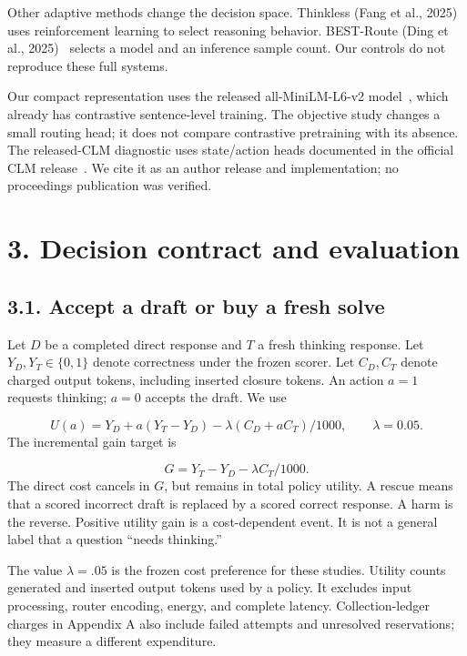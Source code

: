 \documentclass[11pt,a4paper]{article}
\begin{document}
Other adaptive methods change the decision space. Thinkless (Fang et al., 2025)~\citep{fang2025thinkless} uses reinforcement learning to select reasoning behavior. BEST-Route (Ding et al., 2025)~\citep{ding2025bestroute} selects a model and an inference sample count. Our controls do not reproduce these full systems.

Our compact representation uses the released all-MiniLM-L6-v2 model~\citep{sentencetransformersAllMiniLML6v2}, which already has contrastive sentence-level training. The objective study changes a small routing head; it does not compare contrastive pretraining with its absence. The released-CLM diagnostic uses state/action heads documented in the official CLM release~\citep{kwok2026clm}. We cite it as an author release and implementation; no proceedings publication was verified.

\section*{3. Decision contract and evaluation}\label{sec:3-decision-contract-and-evaluation}
\subsection*{3.1. Accept a draft or buy a fresh solve}\label{sec:31-accept-a-draft-or-buy-a-fresh-solve}
Let \(D\) be a completed direct response and \(T\) a fresh thinking response. Let \(Y_D,Y_T\in\{0,1\}\) denote correctness under the frozen scorer. Let \(C_D,C_T\) denote charged output tokens, including inserted closure tokens. An action \(a=1\) requests thinking; \(a=0\) accepts the draft. We use

\[
U(a)=Y_D+a(Y_T-Y_D)-\lambda(C_D+aC_T)/1000,\qquad \lambda=0.05.
\]
The incremental gain target is

\[
G=Y_T-Y_D-\lambda C_T/1000.
\]
The direct cost cancels in \(G\), but remains in total policy utility. A rescue means that a scored incorrect draft is replaced by a scored correct response. A harm is the reverse. Positive utility gain is a cost-dependent event. It is not a general label that a question ``needs thinking.''

The value \(\lambda=.05\) is the frozen cost preference for these studies. Utility counts generated and inserted output tokens used by a policy. It excludes input processing, router encoding, energy, and complete latency. Collection-ledger charges in Appendix A also include failed attempts and unresolved reservations; they measure a different expenditure.
\end{document}
